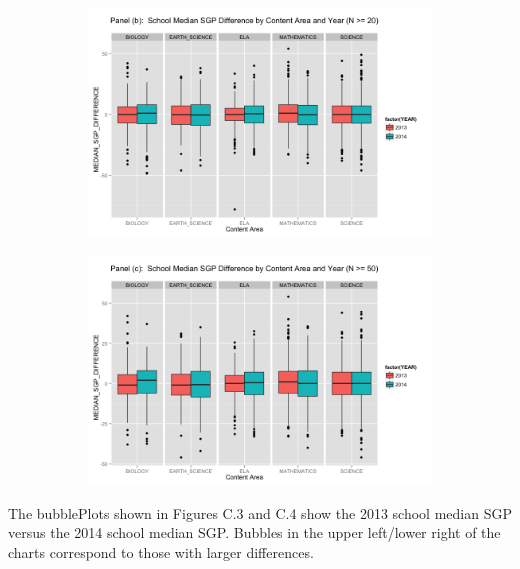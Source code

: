 \documentclass[12pt]{article}
\begin{document}
\begin{figure}[H]
  \begin{subfigure}[b]{\textwidth}
    \includegraphics[width=\textwidth]{../img/Appendices/Appendix_C/Boxplot_MSGP_by_Year20-1.png}
  \end{subfigure}
  \begin{subfigure}[b]{\textwidth}
    \includegraphics[width=\textwidth]{../img/Appendices/Appendix_C/Boxplot_MSGP_by_Year50-1.png}
  \end{subfigure}
\end{figure}

The bubblePlots shown in Figures C.3 and C.4 show the 2013 school median
SGP versus the 2014 school median SGP. Bubbles in the upper left/lower
right of the charts correspond to those with larger differences.
\end{document}
